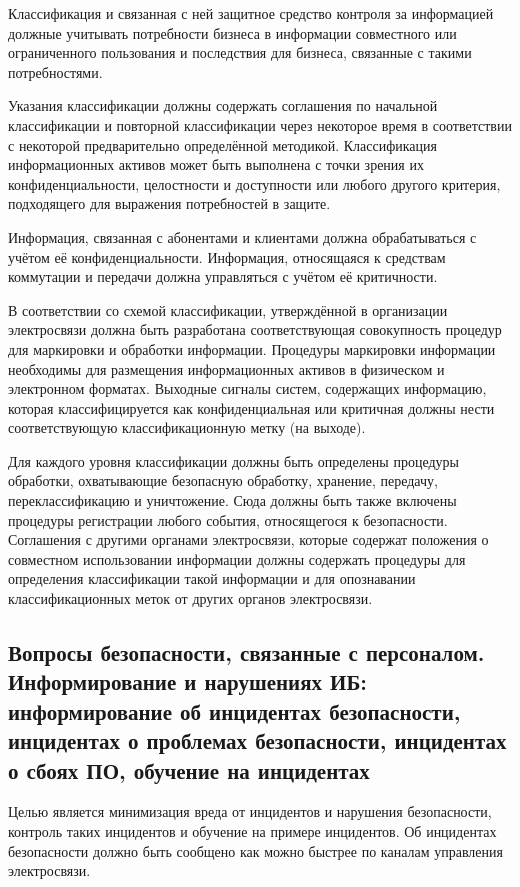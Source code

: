 \documentclass[12pt, russian, oneside, article]{ncc}
\begin{document}
Классификация и связанная с ней защитное средство контроля за информацией должные учитывать потребности бизнеса в информации совместного или ограниченного пользования и последствия для бизнеса, связанные с такими потребностями.

Указания классификации должны содержать соглашения по начальной классификации и повторной классификации через некоторое время в соответствии с некоторой предварительно определённой методикой. Классификация информационных активов может быть выполнена с точки зрения их конфиденциальности, целостности и доступности или любого другого критерия, подходящего для выражения потребностей в защите.

Информация, связанная с абонентами и клиентами должна обрабатываться с учётом её конфиденциальности. Информация, относящаяся к средствам коммутации и передачи должна управляться с учётом её критичности.

В соответствии со схемой классификации, утверждённой в организации электросвязи должна быть разработана соответствующая совокупность процедур для маркировки и обработки информации. Процедуры маркировки информации необходимы для размещения информационных активов в физическом и электронном форматах. Выходные сигналы систем, содержащих информацию, которая классифицируется как конфиденциальная или критичная должны нести соответствующую классификационную метку (на выходе).

Для каждого уровня классификации должны быть определены процедуры обработки, охватывающие безопасную обработку, хранение, передачу, переклассификацию и уничтожение. Сюда должны быть также включены процедуры регистрации любого события, относящегося к безопасности. Соглашения с другими органами электросвязи, которые содержат положения о совместном использовании информации должны содержать процедуры для определения классификации такой информации и для опознавании классификационных меток от других органов электросвязи.
\subsection{Вопросы безопасности, связанные с персоналом. Информирование и нарушениях ИБ: информирование об инцидентах безопасности, инцидентах о проблемах безопасности, инцидентах о сбоях ПО, обучение на инцидентах}
\label{sec-5_4}


Целью является минимизация вреда от инцидентов и нарушения безопасности, контроль таких инцидентов и обучение на примере инцидентов. Об инцидентах безопасности должно быть сообщено как можно быстрее по каналам управления электросвязи.
\end{document}
